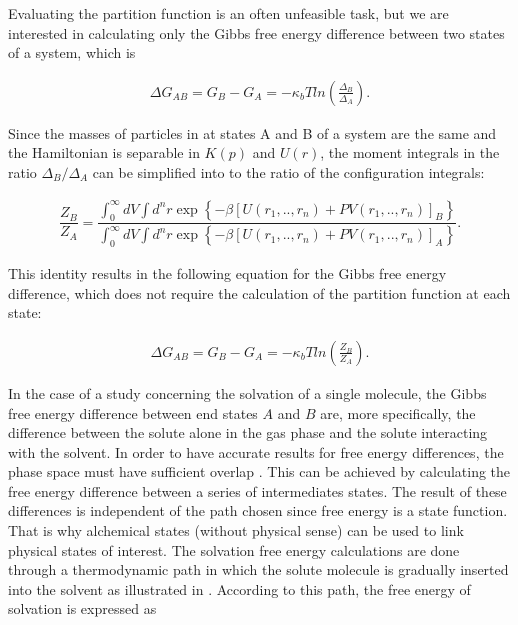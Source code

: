     Evaluating the partition function is an often unfeasible task, but we are interested in calculating only the Gibbs free energy difference between two states of a system, which is  
    
    \begin{equation}
    \begin{aligned}
    \Delta G_{AB} = G_{B} - G_{A}= -\kappa_{b}T ln \left( \frac{\Delta_{B}}{\Delta_{A}}\right) .
    \end{aligned}
    \end{equation}
    
    Since the masses of particles in at states A and B of a system are the same and the Hamiltonian is separable in $K(p)$ and $U(r)$, the moment integrals in the ratio ${\Delta_{B}}/{\Delta_{A}}$ can be simplified into to the ratio of the configuration integrals:
    
    \begin{equation}
    \label{eq:partiso}
    \begin{aligned}
    \dfrac{Z_{B}}{Z_{A}} = \dfrac{\int_{0}^{\infty} dV \int d^{n}r \exp \left\lbrace -\beta \left[U(r_{1},..,r_{n}) + PV(r_{1},..,r_{n}) \right]_{B} \right\rbrace}{\int_{0}^{\infty} dV \int d^{n}r \exp \left\lbrace  -\beta \left[U(r_{1},..,r_{n}) + PV(r_{1},..,r_{n}) \right]_{A} \right\rbrace }.
    \end{aligned}
    \end{equation}
    
    This identity results in the following equation for the Gibbs free energy difference, which does not  require the calculation of the partition function at each state:
    
    \begin{equation}
    \label{eq:dif}
    \begin{aligned}
    \Delta G_{AB} = G_{B} - G_{A}= -\kappa_{b}T ln \left( \frac{Z_{B}}{Z_{A}}\right).
    \end{aligned}
    \end{equation}
    
    In the case of a study concerning the solvation of a single molecule, the Gibbs free energy difference between end states $A$ and $B$ are, more specifically, the difference between the solute alone in the gas phase and the solute interacting with the solvent. In order to have accurate results for free energy differences, the phase space must have sufficient overlap  \cite{klimovich}. This can be achieved by calculating the free energy difference between a series of intermediates states. The result of these differences is independent of the path chosen since free energy is a state function. That is why alchemical states (without physical sense) can be used to link physical states of interest. The solvation free energy calculations are done through a thermodynamic path in which the solute molecule is gradually inserted into the solvent as illustrated in . According to this path, the free energy of solvation is expressed as
    
